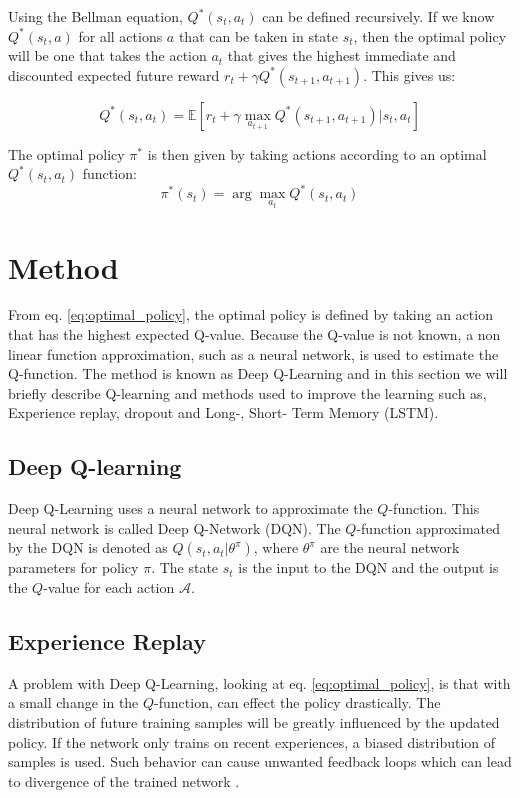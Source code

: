 Using the Bellman equation, $Q^*(s_t, a_t)$ can be defined recursively. If we know $Q^*(s_t, a)$ for all actions $a$ that can be taken in state $s_t$, then the optimal policy will be one that takes the action $a_{t}$ that gives the highest immediate and discounted expected future reward $r_t + \gamma Q^*(s_{t+1}, a_{t+1})$. This gives us: 

\begin{equation}
Q^*(s_t,a_t)= \mathbb{E}[r_t + \gamma \max_{a_{t+1}} Q^*(s_{t+1}, a_{t+1})| s_t, a_t]
\label{eq:q-function}
\end{equation}

The optimal policy $\pi^*$ is then given by taking actions according to an optimal $Q^*(s_t,a_t)$ function: 
\begin{equation}
\pi^*(s_t) = \arg\max_{a_t} Q^*(s_t,a_t)
\label{eq:optimal_policy}
\end{equation}

\section{Method}
\label{sec:method}
From eq. \ref{eq:optimal_policy}, the optimal policy is defined by taking an action that has the highest expected Q-value. Because the Q-value is not known, a non linear function approximation, such as a neural network, is used to estimate the Q-function. The method is known as Deep Q-Learning \cite{MnihPlayingLearning} and in this section we will briefly describe Q-learning and methods used to improve the learning such as, Experience replay, dropout and Long-, Short- Term Memory (LSTM).

\subsection{Deep Q-learning}
\label{sec:dqn}
Deep Q-Learning uses a neural network to approximate the $Q$-function. This neural network is called Deep Q-Network (DQN). The $Q$-function approximated by the DQN is denoted as $Q(s_t,a_t|\theta^\pi)$, where $\theta^\pi$ are the neural network parameters for policy $\pi$. The state $s_t$ is the input to the DQN and the output is the $Q$-value for each action $\mathcal{A}$.

\subsection{Experience Replay}
A problem with Deep Q-Learning, looking at eq. \ref{eq:optimal_policy}, is that with a small change in the $Q$-function, can effect the policy drastically. The distribution of future training samples will be greatly influenced by the updated policy. If the network only trains on recent experiences, a biased distribution of samples is used. Such behavior can cause unwanted feedback loops which can lead to divergence of the trained network \cite{Tsitsiklis1997AnApproximation}.


